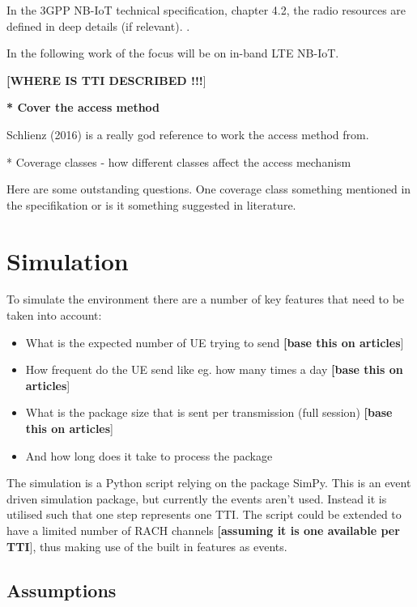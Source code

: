 \documentclass[10pt,a4paper,titlepage,twoside]{article}
\newcommand{\note}[1]{\textbf{[\color{ymablue}#1}]}
\newcommand{\point}[1]{\textbf{\color{ymared} #1}}
\begin{document}
In the 3GPP NB-IoT technical specification, chapter 4.2, the radio resources are defined in deep details (if relevant).
\cite{schlienz}.

In the following work of the focus will be on in-band LTE NB-IoT.

\note{WHERE IS TTI DESCRIBED !!!}

\point{* Cover the access method}

Schlienz (2016) is a really god reference to work the access method from.

* Coverage classes - how different classes affect the access mechanism

Here are some outstanding questions. One coverage class something mentioned in the specifikation or is it something suggested in literature.

\clearpage
\section{Simulation}

To simulate the environment there are a number of key features that need to be taken into account:

\begin{itemize}
\item What is the expected number of UE trying to send \note{base this on articles}
\item How frequent do the UE send like eg. how many times a day \note{base this on articles}
\item What is the package size that is sent per transmission (full session) \note{base this on articles}
\item And how long does it take to process the package
\end{itemize}

The simulation is a Python script relying on the package SimPy. This is an event driven simulation package, but currently the events aren't used. Instead it is utilised such that one step represents one TTI. The script could be extended to have a limited number of RACH channels \note{assuming it is one available per TTI}, thus making use of the built in features as events.

\subsection{Assumptions}
\end{document}
